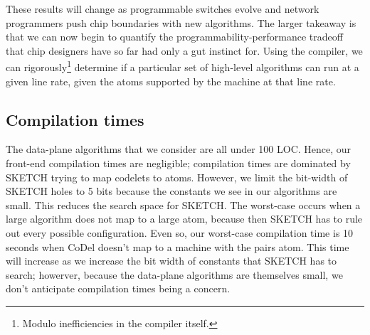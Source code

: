These results will change as programmable switches evolve and network
programmers push chip boundaries with new algorithms.  The larger takeaway is
that we can now begin to quantify the programmability-performance tradeoff that
chip designers have so far had only a gut instinct for. Using the \pktlanguage
compiler, we can rigorously\footnote{Modulo inefficiencies in the compiler
itself.} determine if a particular set of high-level algorithms can run at a
given line rate, given the atoms supported by the \absmachine machine at that
line rate.

\subsection{Compilation times}
The data-plane algorithms that we consider are all under 100 LOC. Hence, our
front-end compilation times are negligible; compilation times are dominated by
SKETCH trying to map codelets to atoms. However, we limit the bit-width of
SKETCH holes to 5 bits because the constants we see in our algorithms are
small.  This reduces the search space for SKETCH.  The worst-case occurs when a
large algorithm does not map to a large atom, because then SKETCH has to rule
out every possible configuration. Even so, our worst-case compilation time is
10 seconds when CoDel doesn't map to a \absmachine machine with the pairs atom.
This time will increase as we increase the bit width of constants that SKETCH
has to search; howerver, because the data-plane algorithms are themselves
small, we don't anticipate compilation times being a concern.

